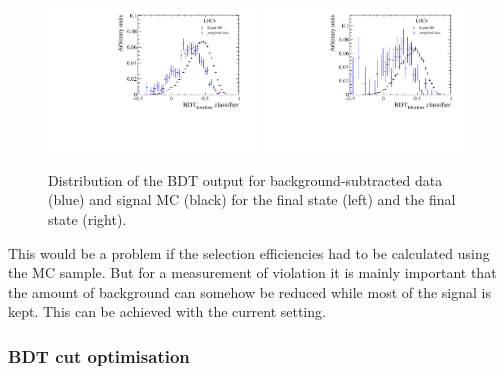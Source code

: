 \begin{figure}[htbp]
    \centering
    \includegraphics[width=0.49\textwidth]{07-B02DD/figs/BDTComparison_Kpipi.pdf}
    \includegraphics[width=0.49\textwidth]{07-B02DD/figs/BDTComparison_KKpi.pdf}
    \caption{Distribution of the BDT output for background-subtracted data (blue) and
    signal MC (black) for the \KpipiKpipi final state (left) and the
    \KKpiKpipi final state (right).}
    \label{fig:b02dd:selection:mva:bdtcomparison}
\end{figure}
%
This would be a problem if the selection efficiencies had to be calculated
using the MC sample. But for a measurement of \CP violation it is mainly
important that the amount of background can somehow be reduced while most of
the signal is kept. This can be achieved with the current setting.

\subsubsection{BDT cut optimisation}
\label{sec:b02dd:selection:mva:optimisation}

